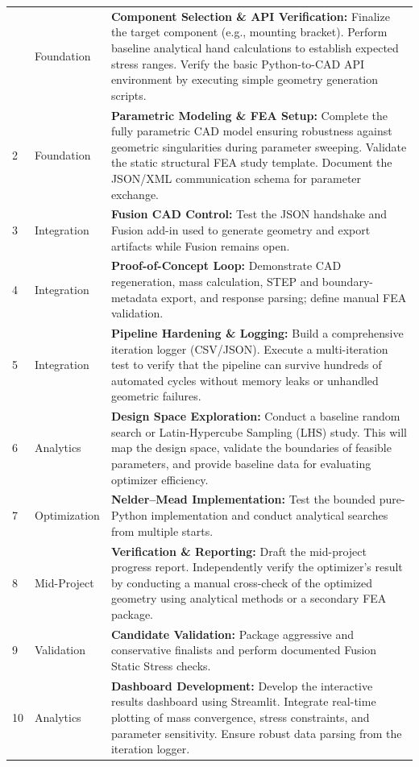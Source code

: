 \begin{longtable}{p{1.5cm} p{2.5cm} p{10cm}}
    \bottomrule
    \endlastfoot
        1 & Foundation & \textbf{Component Selection \& API Verification:} Finalize the target component (e.g., mounting bracket). Perform baseline analytical hand calculations to establish expected stress ranges. Verify the basic Python-to-CAD API environment by executing simple geometry generation scripts. \\
        2 & Foundation & \textbf{Parametric Modeling \& FEA Setup:} Complete the fully parametric CAD model ensuring robustness against geometric singularities during parameter sweeping. Validate the static structural FEA study template. Document the JSON/XML communication schema for parameter exchange. \\
        3 & Integration & \textbf{Fusion CAD Control:} Test the JSON handshake and Fusion add-in used to generate geometry and export artifacts while Fusion remains open. \\
        4 & Integration & \textbf{Proof-of-Concept Loop:} Demonstrate CAD regeneration, mass calculation, STEP and boundary-metadata export, and response parsing; define manual FEA validation. \\
        5 & Integration & \textbf{Pipeline Hardening \& Logging:} Build a comprehensive iteration logger (CSV/JSON). Execute a multi-iteration test to verify that the pipeline can survive hundreds of automated cycles without memory leaks or unhandled geometric failures. \\
        6 & Analytics & \textbf{Design Space Exploration:} Conduct a baseline random search or Latin-Hypercube Sampling (LHS) study. This will map the design space, validate the boundaries of feasible parameters, and provide baseline data for evaluating optimizer efficiency. \\
        7 & Optimization & \textbf{Nelder--Mead Implementation:} Test the bounded pure-Python implementation and conduct analytical searches from multiple starts. \\
        8 & Mid-Project & \textbf{Verification \& Reporting:} Draft the mid-project progress report. Independently verify the optimizer's result by conducting a manual cross-check of the optimized geometry using analytical methods or a secondary FEA package. \\
        9 & Validation & \textbf{Candidate Validation:} Package aggressive and conservative finalists and perform documented Fusion Static Stress checks. \\
        10 & Analytics & \textbf{Dashboard Development:} Develop the interactive results dashboard using Streamlit. Integrate real-time plotting of mass convergence, stress constraints, and parameter sensitivity. Ensure robust data parsing from the iteration logger. \\

\end{longtable}
